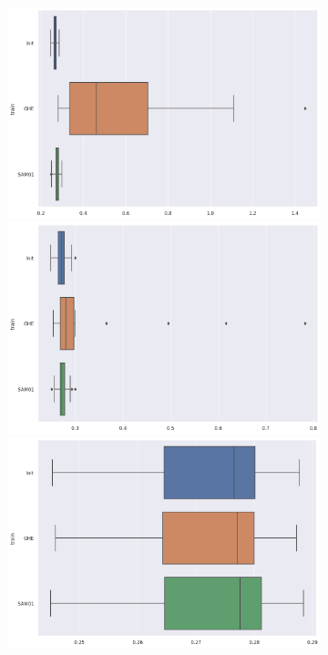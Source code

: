 \documentclass{article}
\theoremstyle{definition}
\begin{document}
\begin{figure}[ht]
     \centering
     \begin{subfigure}[b]{0.15\textwidth}
         \centering
         \includegraphics[width=\textwidth]{imgs/Illu/1000Epochs/Imb/Boxplots_predTest_Xhat.png}
         \quad
         \includegraphics[width=\textwidth]{imgs/Illu/2000Epochs/Imb/Boxplots_predTest_Xhat.png}
         \quad
         \includegraphics[width=\textwidth]{imgs/Illu/3000Epochs/Imb/Boxplots_predTest_Xhat.png}       

\end{subfigure}
\end{figure}
\end{document}
